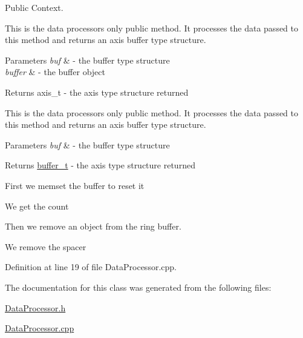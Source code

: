 \-Public \-Context. 

\-This is the data processors only public method. \-It processes the data passed to this method and returns an axis buffer type structure.


\begin{DoxyParams}{\-Parameters}
{\em buf} & -\/ the buffer type structure \\
\hline
{\em buffer} & -\/ the buffer object \\
\hline
\end{DoxyParams}
\begin{DoxyReturn}{\-Returns}
axis\-\_\-t -\/ the axis type structure returned
\end{DoxyReturn}
\-This is the data processors only public method. \-It processes the data passed to this method and returns an axis buffer type structure.


\begin{DoxyParams}{\-Parameters}
{\em buf} & -\/ the buffer type structure \\
\hline
\end{DoxyParams}
\begin{DoxyReturn}{\-Returns}
\hyperlink{structbuffer__t}{buffer\-\_\-t} -\/ the axis type structure returned 
\end{DoxyReturn}
\-First we memset the buffer to reset it

\-We get the count

\-Then we remove an object from the ring buffer.

\-We remove the spacer 

\-Definition at line 19 of file \-Data\-Processor.\-cpp.



\-The documentation for this class was generated from the following files\-:\begin{DoxyCompactItemize}
\item 
\hyperlink{_data_processor_8h}{\-Data\-Processor.\-h}\item 
\hyperlink{_data_processor_8cpp}{\-Data\-Processor.\-cpp}\end{DoxyCompactItemize}
